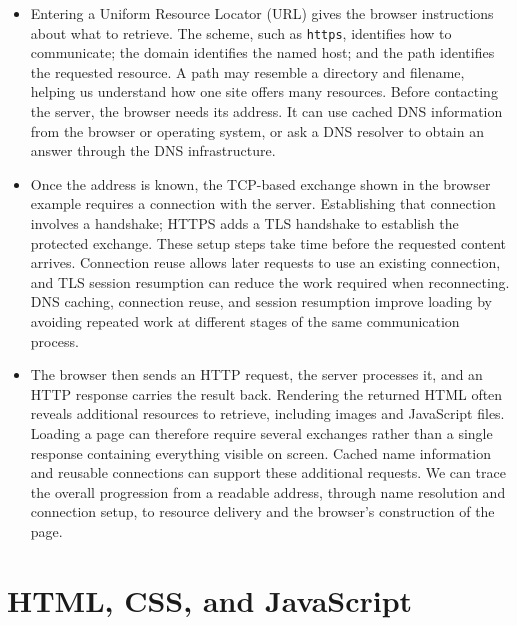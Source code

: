 \documentclass[10pt]{article}
\begin{document}
\begin{itemize}[leftmargin=1.25em, itemsep=0.3em, parsep=0pt, topsep=0pt]
    \item Entering a Uniform Resource Locator (URL) gives the browser instructions about what to retrieve. The scheme, such as \texttt{https}, identifies how to communicate; the domain identifies the named host; and the path identifies the requested resource. A path may resemble a directory and filename, helping us understand how one site offers many resources. Before contacting the server, the browser needs its address. It can use cached DNS information from the browser or operating system, or ask a DNS resolver to obtain an answer through the DNS infrastructure.

    \item Once the address is known, the TCP-based exchange shown in the browser example requires a connection with the server. Establishing that connection involves a handshake; HTTPS adds a TLS handshake to establish the protected exchange. These setup steps take time before the requested content arrives. Connection reuse allows later requests to use an existing connection, and TLS session resumption can reduce the work required when reconnecting. DNS caching, connection reuse, and session resumption improve loading by avoiding repeated work at different stages of the same communication process.

    \item The browser then sends an HTTP request, the server processes it, and an HTTP response carries the result back. Rendering the returned HTML often reveals additional resources to retrieve, including images and JavaScript files. Loading a page can therefore require several exchanges rather than a single response containing everything visible on screen. Cached name information and reusable connections can support these additional requests. We can trace the overall progression from a readable address, through name resolution and connection setup, to resource delivery and the browser's construction of the page.
\end{itemize}

\section*{HTML, CSS, and JavaScript}
\end{document}
